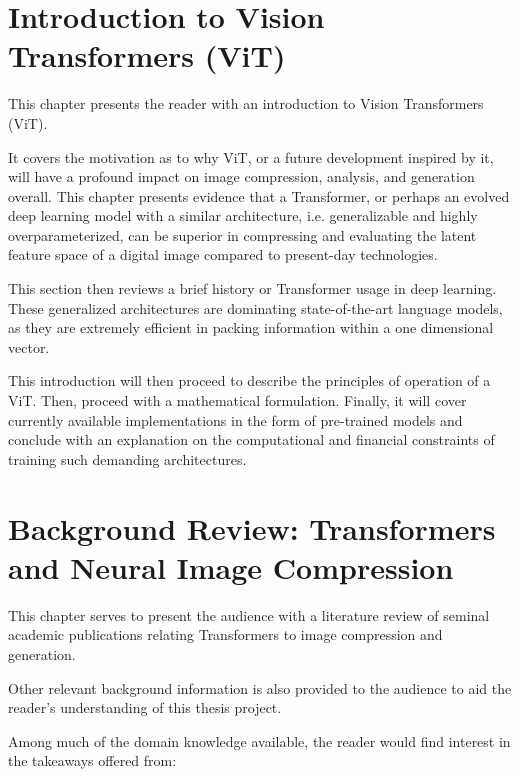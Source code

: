\documentclass[pdftex,11pt,titlepage,twoside,openright]{report}
\begin{document}
\setcounter{page}{1}



\chapter{Introduction to Vision Transformers (ViT)}


This chapter presents the reader with an introduction to Vision Transformers (ViT).

It covers the motivation as to why ViT, or a future development inspired by it,
will have a profound impact on image compression, analysis, and generation overall.
This chapter presents evidence that a Transformer, or perhaps an evolved deep learning model with a
similar architecture, i.e. generalizable and highly overparameterized, can be superior in
compressing and evaluating the latent feature space of a digital image compared to present-day
technologies.

This section then reviews a brief history or Transformer usage in deep learning.
These generalized architectures are dominating state-of-the-art language models,
as they are extremely efficient in packing information within a one dimensional vector.

This introduction will then proceed to describe the principles of operation of a ViT. Then, proceed with
a mathematical formulation. Finally, it will cover currently available implementations
in the form of pre-trained models and conclude with an explanation on the computational and
financial constraints of training such demanding architectures.

\ThinHRule

\newpage



\chapter{Background Review: Transformers and Neural Image Compression}


This chapter serves to present the audience with a literature review of seminal academic
publications relating Transformers to image compression and generation.

Other relevant background information is also provided to the audience
to aid the reader's understanding of this thesis project.

Among much of the domain knowledge available, the reader would find interest in the 
takeaways offered from:
\end{document}
